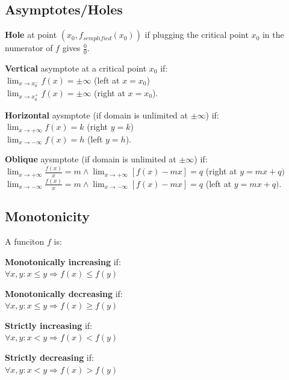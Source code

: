 \documentclass[8pt,a4paper]{extarticle}     %
\theoremstyle{definition}
\theoremstyle{definition}
\theoremstyle{definition}
\begin{document}
\begin{multicols}{4}
\subsection{Asymptotes/Holes}
\begin{bulletlist}
	\item \textbf{Hole} at point $(x_0, f_{\textit{semplified}}(x_0))$ if plugging the critical point $x_0$ in the numerator of $f$ gives $\frac{0}{0}$.
	\item \textbf{Vertical} asymptote at a critical point $x_0$ if:\\
	$\lim_{x\to x_0^-}f(x) = \pm \infty$ (left at $x=x_0$)\\
	$\lim_{x\to x_0^+}f(x) = \pm \infty$ (right at $x=x_0$).
	\item \textbf{Horizontal} aysmptote (if domain is unlimited at $\pm \infty$) if:\\
	$\lim_{x\to +\infty}f(x) = k$ (right $y=k$)\\
	$\lim_{x\to -\infty}f(x) = h$ (left $y=h$).
	\item \textbf{Oblique} aysmptote (if domain is unlimited at $\pm \infty$) if: \\
	$\lim_{x\to +\infty}\frac{f(x)}{x} = m \land \lim_{x\to +\infty}[f(x)-mx] = q$ (right at $y = mx+q)$\\
	$\lim_{x\to -\infty}\frac{f(x)}{x} = m \land \lim_{x\to -\infty}[f(x)-mx] = q$ (left at $y = mx+q).$
\end{bulletlist}
\subsection{Monotonicity}
A funciton $f$ is:
\begin{bulletlist}
	\item \textbf{Monotonically increasing} if: \\$\forall x,y: x \leq y \Rightarrow f(x) \leq f(y)$
	\item \textbf{Monotonically decreasing} if: \\$\forall x,y: x \leq y \Rightarrow f(x) \geq f(y)$
	\item \textbf{Strictly increasing} if: \\$\forall x,y: x < y \Rightarrow f(x) < f(y)$
	\item \textbf{Strictly decreasing} if: \\$\forall x,y: x < y \Rightarrow f(x) > f(y)$
\end{bulletlist}


\end{multicols}
\end{document}
